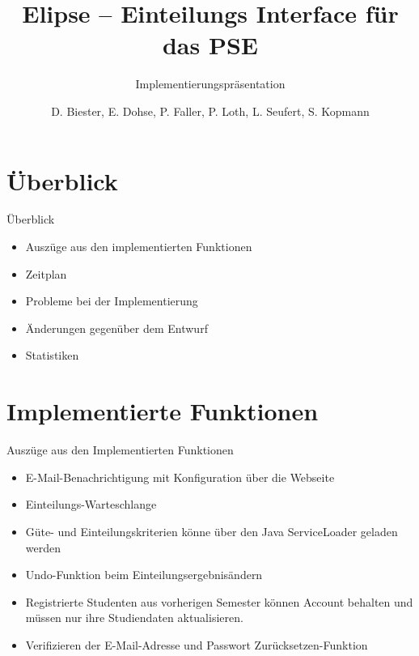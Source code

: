 \documentclass[18pt, xcolor=table]{beamer}
\title[Elipse]{Elipse -- Einteilungs Interface für das PSE}
\subtitle{Implementierungspräsentation}
\author{D. Biester, E. Dohse, P. Faller, P. Loth, L. Seufert, S. Kopmann}
\institute{IPD Snelting}
\begin{document}

\begin{frame}
\titlepage
\end{frame}
\section{Überblick}
\begin{frame}{Überblick}
\begin{itemize}
  \item Auszüge aus den implementierten Funktionen
  \item Zeitplan
  \item Probleme bei der Implementierung
  \item Änderungen gegenüber dem Entwurf
  \item Statistiken
\end{itemize}
\end{frame}

\section{Implementierte Funktionen}
\begin{frame}{Auszüge aus den Implementierten Funktionen}
\begin{itemize}
  \item E-Mail-Benachrichtigung mit Konfiguration über die Webseite
  \item Einteilungs-Warteschlange
  \item Güte- und Einteilungskriterien könne über den Java ServiceLoader geladen werden
  \item Undo-Funktion beim Einteilungsergebnisändern
  \item Registrierte Studenten aus vorherigen Semester können Account behalten und müssen nur ihre Studiendaten aktualisieren.
  \item Verifizieren der E-Mail-Adresse und Passwort Zurücksetzen-Funktion
\end{itemize}
\end{frame}

\end{document}
